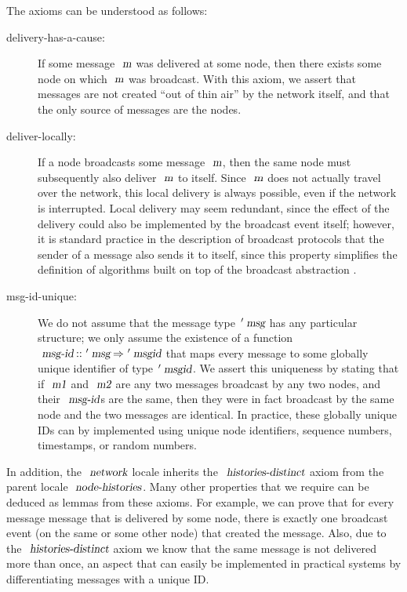 \vspace{0.35em}
The axioms can be understood as follows:
\begin{description}
    \item[delivery-has-a-cause:] If some message $\isa{m}$ was delivered at some node, then there exists some node on which $\isa{m}$ was broadcast.
        With this axiom, we assert that messages are not created ``out of thin air'' by the network itself, and that the only source of messages are the nodes.
    \item[deliver-locally:] If a node broadcasts some message $\isa{m}$, then the same node must subsequently also deliver $\isa{m}$ to itself.
        Since $\isa{m}$ does not actually travel over the network, this local delivery is always possible, even if the network is interrupted.
        Local delivery may seem redundant, since the effect of the delivery could also be implemented by the broadcast event itself; however, it is standard practice in the description of broadcast protocols that the sender of a message also sends it to itself, since this property simplifies the definition of algorithms built on top of the broadcast abstraction \cite{Cachin:2011wt}.
    \item[msg-id-unique:] We do not assume that the message type $\isacharprime\isa{msg}$ has any particular structure; we only assume the existence of a function $\isa{msg-id} \mathbin{\isacharcolon\isacharcolon} \isacharprime\isa{msg} \mathbin{\isasymRightarrow} \isacharprime\isa{msgid}$ that maps every message to some globally unique identifier of type $\isacharprime\isa{msgid}$.
        We assert this uniqueness by stating that if $\isa{m1}$ and $\isa{m2}$ are any two messages broadcast by any two nodes, and their $\isa{msg-id}$s are the same, then they were in fact broadcast by the same node and the two messages are identical. 
        In practice, these globally unique IDs can by implemented using unique node identifiers, sequence numbers, timestamps, or random numbers.
\end{description}

In addition, the $\isa{network}$ locale inherits the $\isa{histories-distinct}$ axiom from the parent locale $\isa{node-histories}$.
Many other properties that we require can be deduced as lemmas from these axioms.
For example, we can prove that for every message message that is delivered by some node, there is exactly one broadcast event (on the same or some other node) that created the message.
Also, due to the $\isa{histories-distinct}$ axiom we know that the same message is not delivered more than once, an aspect that can easily be implemented in practical systems by differentiating messages with a unique ID.

